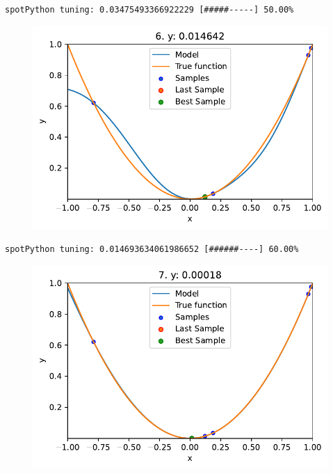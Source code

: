 \documentclass[
  letterpaper,
  DIV=11,
  numbers=noendperiod]{scrreprt}
\begin{document}
\begin{verbatim}
spotPython tuning: 0.03475493366922229 [#####-----] 50.00% 
\end{verbatim}

\begin{figure}[H]

{\centering \includegraphics{010_num_spot_sklearn_surrogate_files/figure-pdf/cell-21-output-6.pdf}

}

\end{figure}

\begin{verbatim}
spotPython tuning: 0.014693634061986652 [######----] 60.00% 
\end{verbatim}

\begin{figure}[H]

{\centering \includegraphics{010_num_spot_sklearn_surrogate_files/figure-pdf/cell-21-output-8.pdf}

}

\end{figure}
\end{document}
